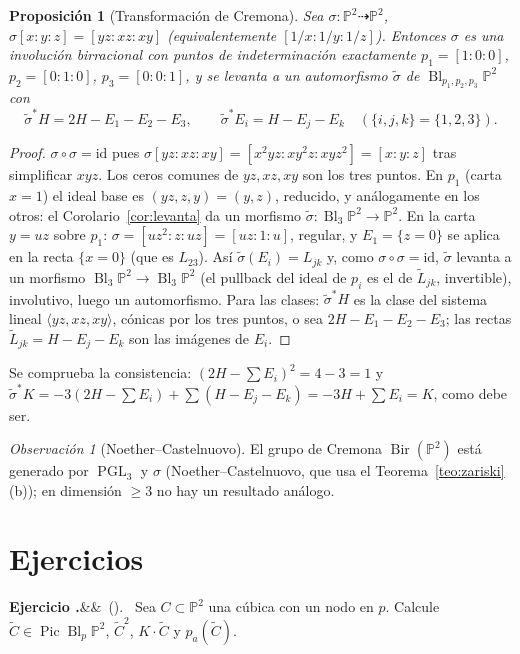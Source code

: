 \documentclass[11pt,a4paper,oneside]{book}
\newcommand{\Bl}{\operatorname{Bl}}
\newcommand{\Pic}{\operatorname{Pic}}
\newcommand{\PP}{\mathbb{P}}
\theoremstyle{plain}
\newtheorem{proposicion}[teorema]{Proposición}
\theoremstyle{definition}
\theoremstyle{remark}
\newtheorem{observacion}[teorema]{Observación}
\newcounter{ejer}[chapter]
\renewcommand{\theejer}{\thechapter.\arabic{ejer}}
\newenvironment{ejercicio}[1][]{\refstepcounter{ejer}\par\medskip\noindent\textbf{Ejercicio \theejer}\ifx&#1&\else\ (#1)\fi.\ }{\par}
\begin{document}
\begin{proposicion}[Transformación de Cremona]\label{prop:cremona}
Sea $\sigma:\PP^2\dashrightarrow\PP^2$, $\sigma[x:y:z]=[yz:xz:xy]$ (equivalentemente $[1/x:1/y:1/z]$). Entonces $\sigma$ es una involución birracional con puntos de indeterminación exactamente $p_1=[1:0:0]$, $p_2=[0:1:0]$, $p_3=[0:0:1]$, y se levanta a un automorfismo $\tilde\sigma$ de $\Bl_{p_1,p_2,p_3}\PP^2$ con
\[
\tilde\sigma^*H=2H-E_1-E_2-E_3,\qquad\tilde\sigma^*E_i=H-E_j-E_k\quad(\{i,j,k\}=\{1,2,3\}).
\]
\end{proposicion}

\begin{proof}
$\sigma\circ\sigma=\mathrm{id}$ pues $\sigma[yz:xz:xy]=[x^2yz:xy^2z:xyz^2]=[x:y:z]$ tras simplificar $xyz$. Los ceros comunes de $yz,xz,xy$ son los tres puntos. En $p_1$ (carta $x=1$) el ideal base es $(yz,z,y)=(y,z)$, reducido, y análogamente en los otros: el Corolario~\ref{cor:levanta} da un morfismo $\tilde\sigma:\Bl_3\PP^2\to\PP^2$. En la carta $y=uz$ sobre $p_1$: $\sigma=[uz^2:z:uz]=[uz:1:u]$, regular, y $E_1=\{z=0\}$ se aplica en la recta $\{x=0\}$ (que es $L_{23}$). Así $\tilde\sigma(E_i)=L_{jk}$ y, como $\sigma\circ\sigma=\mathrm{id}$, $\tilde\sigma$ levanta a un morfismo $\Bl_3\PP^2\to\Bl_3\PP^2$ (el pullback del ideal de $p_i$ es el de $\tilde L_{jk}$, invertible), involutivo, luego un automorfismo. Para las clases: $\tilde\sigma^*H$ es la clase del sistema lineal $\langle yz,xz,xy\rangle$, cónicas por los tres puntos, o sea $2H-E_1-E_2-E_3$; las rectas $\tilde L_{jk}=H-E_j-E_k$ son las imágenes de $E_i$.
\end{proof}

Se comprueba la consistencia: $(2H-\sum E_i)^2=4-3=1$ y $\tilde\sigma^*K=-3(2H-\sum E_i)+\sum(H-E_j-E_k)=-3H+\sum E_i=K$, como debe ser.

\begin{observacion}[Noether--Castelnuovo]
El grupo de Cremona $\operatorname{Bir}(\PP^2)$ está generado por $\operatorname{PGL}_3$ y $\sigma$ (Noether--Castelnuovo, que usa el Teorema~\ref{teo:zariski}(b)); en dimensión $\ge3$ no hay un resultado análogo.
\end{observacion}

\section*{Ejercicios}

\begin{ejercicio}\label{ej:cubica-nodal}
Sea $C\subset\PP^2$ una cúbica con un nodo en $p$. Calcule $\tilde C\in\Pic\Bl_p\PP^2$, $\tilde C^2$, $K\cdot\tilde C$ y $p_a(\tilde C)$.
\end{ejercicio}
\end{document}
